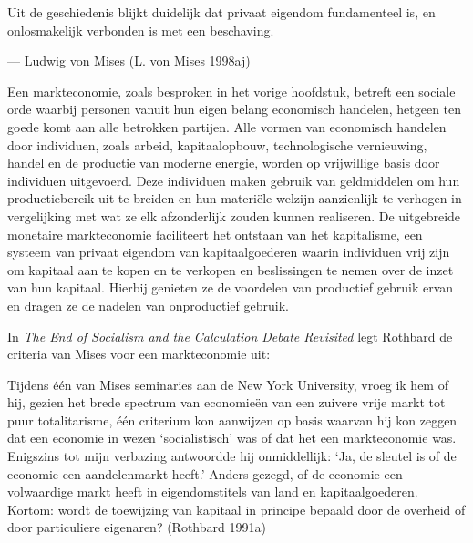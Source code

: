 \documentclass[
  a5paper,
  smalldemyvopaper,11pt,twoside,onecolumn,openright,extrafontsizes,
hidelinks]{memoir}
\begin{document}
Uit de geschiedenis blijkt duidelijk dat privaat eigendom fundamenteel
is, en onlosmakelijk verbonden is met een beschaving.

--- Ludwig von Mises (L. von Mises 1998aj)

Een markteconomie, zoals besproken in het vorige hoofdstuk, betreft een
sociale orde waarbij personen vanuit hun eigen belang economisch
handelen, hetgeen ten goede komt aan alle betrokken partijen. Alle
vormen van economisch handelen door individuen, zoals arbeid,
kapitaalopbouw, technologische vernieuwing, handel en de productie van
moderne energie, worden op vrijwillige basis door individuen uitgevoerd.
Deze individuen maken gebruik van geldmiddelen om hun productiebereik
uit te breiden en hun materiële welzijn aanzienlijk te verhogen in
vergelijking met wat ze elk afzonderlijk zouden kunnen realiseren. De
uitgebreide monetaire markteconomie faciliteert het ontstaan van het
kapitalisme, een systeem van privaat eigendom van kapitaalgoederen
waarin individuen vrij zijn om kapitaal aan te kopen en te verkopen en
beslissingen te nemen over de inzet van hun kapitaal. Hierbij genieten
ze de voordelen van productief gebruik ervan en dragen ze de nadelen van
onproductief gebruik.

In \emph{The End of Socialism and the Calculation Debate Revisited} legt
Rothbard de criteria van Mises voor een markteconomie uit:

Tijdens één van Mises seminaries aan de New York University, vroeg ik
hem of hij, gezien het brede spectrum van economieën van een zuivere
vrije markt tot puur totalitarisme, één criterium kon aanwijzen op basis
waarvan hij kon zeggen dat een economie in wezen `socialistisch' was of
dat het een markteconomie was. Enigszins tot mijn verbazing antwoordde
hij onmiddellijk: `Ja, de sleutel is of de economie een aandelenmarkt
heeft.' Anders gezegd, of de economie een volwaardige markt heeft in
eigendomstitels van land en kapitaalgoederen. Kortom: wordt de
toewijzing van kapitaal in principe bepaald door de overheid of door
particuliere eigenaren? (Rothbard 1991a)
\end{document}
